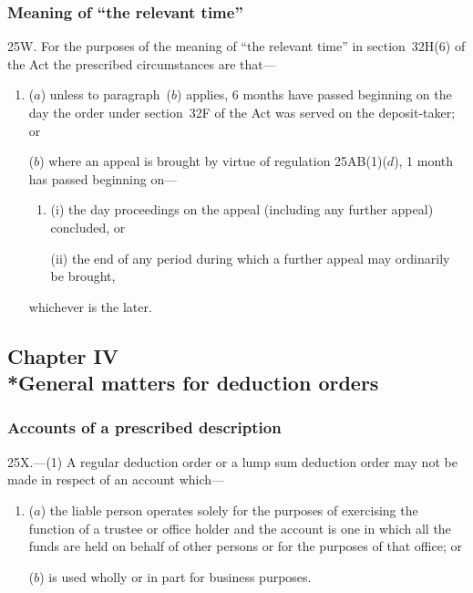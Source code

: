 \documentclass[12pt,a4paper]{article}
\begin{document}

\subsubsection[25W. Meaning of “the relevant time”]{Meaning of “the relevant time”}

25W.  For the purposes of the meaning of “the relevant time” in section~32H(6) of the Act the prescribed circumstances are that—
\begin{enumerate}\item[]
($a$) unless to paragraph~($b$)  applies, 6 months have passed beginning on the day the order under section~32F of the Act was served on the deposit-taker; or

\begin{sloppypar}
($b$) where an appeal is brought by virtue of regulation 25AB(1)($d$), 1 month has passed beginning on—
\end{sloppypar}
\begin{enumerate}\item[]
(i) the day proceedings on the appeal (including any further appeal) concluded, or

(ii) the end of any period during which a further appeal may ordinarily be brought,
\end{enumerate}
whichever is the later.
\end{enumerate}

\subsection[Chapter IV --- General matters for deduction orders]{Chapter IV\\*General matters for deduction orders}

\renewcommand\parthead{--- Part IIIA Chapter IV}

\subsubsection[25X. Accounts of a prescribed description]{Accounts of a prescribed description}

25X.---(1)  A regular deduction order or a lump sum deduction order may not be made in respect of an account which—
\begin{enumerate}\item[]
($a$) the liable person operates solely for the purposes of exercising the function of a trustee or office holder and the account is one in which all the funds are held on behalf of other persons or for the purposes of that office; or

($b$) is used wholly or in part for business purposes.
\end{enumerate}
\end{document}
